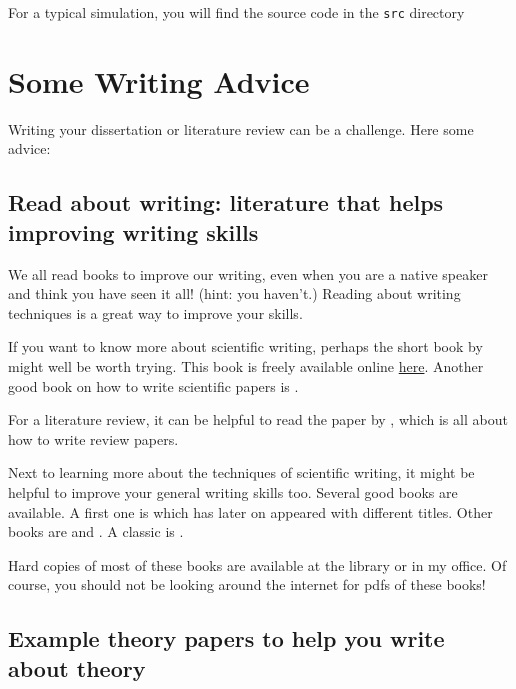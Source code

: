 \documentclass[
]{book}
\begin{document}
For a typical simulation, you will find the source code in the \texttt{src} directory

\hypertarget{some-writing-advice}{%
\chapter{Some Writing Advice}\label{some-writing-advice}}

Writing your dissertation or literature review can be a challenge. Here some advice:

\hypertarget{read-about-writing-literature-that-helps-improving-writing-skills}{%
\section{Read about writing: literature that helps improving writing skills}\label{read-about-writing-literature-that-helps-improving-writing-skills}}

We all read books to improve our writing, even when you are a native speaker and think you have seen it all! (hint: you haven't.) Reading about writing techniques is a great way to improve your skills.

If you want to know more about scientific writing, perhaps the short book by \citet{Mack2018} might well be worth trying. This book is freely available online \href{https://spie.org/Publications/Book/2317706?SSO=1}{here}. Another good book on how to write scientific papers is \citet{Gastel2022}.

For a literature review, it can be helpful to read the paper by \citet{Sayer2018}, which is all about how to write review papers.

Next to learning more about the techniques of scientific writing, it might be helpful to improve your general writing skills too. Several good books are available. A first one is \citet{Williams1990} which has later on appeared
with different titles. Other books are \citet{Pinker2014} and \citet{Zinsser2006}. A classic is \citet{Strunk1959}.

Hard copies of most of these books are available at the library or in my office. Of course, you should not be looking around the internet for pdfs of these books!

\hypertarget{example-theory-papers-to-help-you-write-about-theory}{%
\section{Example theory papers to help you write about theory}\label{example-theory-papers-to-help-you-write-about-theory}}
\end{document}

